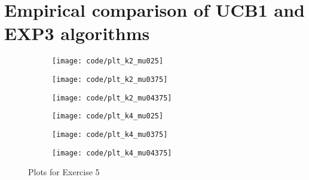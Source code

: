 \documentclass[a4paper]{article}
\begin{document}
\section{Empirical comparison of UCB1 and EXP3 algorithms}
\label{sec:5}
\begin{figure}
  \centering
  \begin{subfigure}[b]{0.49\textwidth}
    \centering
    \texttt{[image: code/plt\_k2\_mu025]}
  \end{subfigure}
  \begin{subfigure}[b]{0.49\textwidth}
    \centering
    \texttt{[image: code/plt\_k2\_mu0375]}
  \end{subfigure}
  \begin{subfigure}[b]{0.49\textwidth}
    \centering
    \texttt{[image: code/plt\_k2\_mu04375]}
  \end{subfigure}
  \begin{subfigure}[b]{0.49\textwidth}
    \centering
    \texttt{[image: code/plt\_k4\_mu025]}
  \end{subfigure}
  \begin{subfigure}[b]{0.49\textwidth}
    \centering
    \texttt{[image: code/plt\_k4\_mu0375]}
  \end{subfigure}
  \begin{subfigure}[b]{0.49\textwidth}
    \centering
    \texttt{[image: code/plt\_k4\_mu04375]}
  \end{subfigure}
  \caption{Plots for Exercise 5}
  \label{plt5}
\end{figure}
\end{document}

